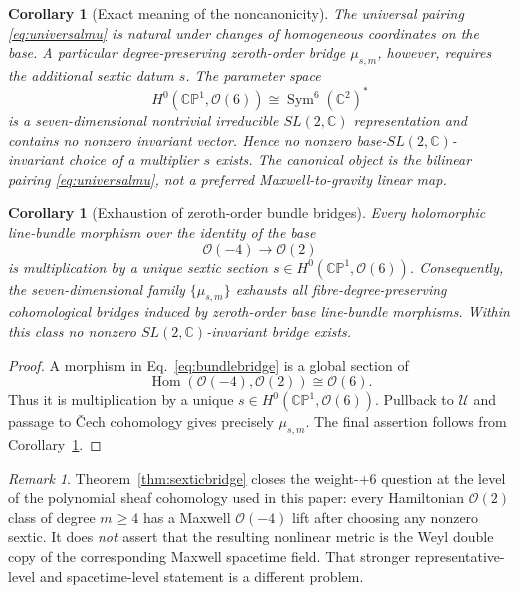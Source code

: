 \documentclass[aps,prd,reprint,nofootinbib,superscriptaddress]{revtex4-2}
\newtheorem{corollary}[theorem]{Corollary}
\theoremstyle{definition}
\theoremstyle{remark}
\newtheorem{remark}[theorem]{Remark}
\newcommand{\C}{\mathbb{C}}
\newcommand{\CP}{\mathbb{CP}}
\newcommand{\cO}{\mathcal{O}}
\newcommand{\cU}{\mathcal{U}}
\newcommand{\Sym}{\operatorname{Sym}}
\begin{document}
\begin{corollary}[Exact meaning of the noncanonicity]
\label{cor:sexticnoncanonical}
The universal pairing \eqref{eq:universalmu} is natural under changes of homogeneous coordinates on the base.  A particular degree-preserving zeroth-order bridge $\mu_{s,m}$, however, requires the additional sextic datum $s$.  The parameter space
\begin{equation}
H^0(\CP^1,\cO(6))\cong\Sym^6(\C^2)^*
\label{eq:sexticrep}
\end{equation}
is a seven-dimensional nontrivial irreducible $SL(2,\C)$ representation and contains no nonzero invariant vector.  Hence no nonzero base-$SL(2,\C)$-invariant \emph{choice} of a multiplier $s$ exists.  The canonical object is the bilinear pairing \eqref{eq:universalmu}, not a preferred Maxwell-to-gravity linear map.
\end{corollary}

\begin{corollary}[Exhaustion of zeroth-order bundle bridges]
\label{cor:zerothorderexhaustion}
Every holomorphic line-bundle morphism over the identity of the base
\begin{equation}
\cO(-4)\longrightarrow\cO(2)
\label{eq:bundlebridge}
\end{equation}
is multiplication by a unique sextic section $s\in H^0(\CP^1,\cO(6))$.  Consequently, the seven-dimensional family $\{\mu_{s,m}\}$ exhausts all fibre-degree-preserving cohomological bridges induced by zeroth-order base line-bundle morphisms.  Within this class no nonzero $SL(2,\C)$-invariant bridge exists.
\end{corollary}

\begin{proof}
A morphism in Eq.~\eqref{eq:bundlebridge} is a global section of
\begin{equation}
\operatorname{Hom}(\cO(-4),\cO(2))\cong\cO(6).
\end{equation}
Thus it is multiplication by a unique $s\in H^0(\CP^1,\cO(6))$.  Pullback to $\cU$ and passage to \v{C}ech cohomology gives precisely $\mu_{s,m}$.  The final assertion follows from Corollary~\ref{cor:sexticnoncanonical}.
\end{proof}

\begin{remark}
Theorem~\ref{thm:sexticbridge} closes the weight-$+6$ question at the level of the polynomial sheaf cohomology used in this paper: every Hamiltonian $\cO(2)$ class of degree $m\ge4$ has a Maxwell $\cO(-4)$ lift after choosing any nonzero sextic.  It does \emph{not} assert that the resulting nonlinear metric is the Weyl double copy of the corresponding Maxwell spacetime field.  That stronger representative-level and spacetime-level statement is a different problem.
\end{remark}
\end{document}
